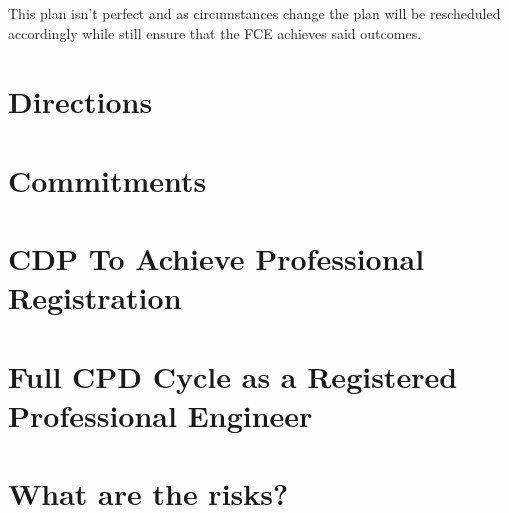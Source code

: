 \documentclass[11pt,a4paper]{article}
\begin{document}
		This plan isn't perfect and as circumstances change the plan will be rescheduled accordingly while still ensure that the FCE achieves said outcomes.
		
	\section{Directions}
		
	
	\section{Commitments}
	
	
	\section{CDP To Achieve Professional Registration}
	
	
	\section{Full CPD Cycle as a Registered Professional Engineer}
	
	\section{What are the risks?}
				
\end{document}

